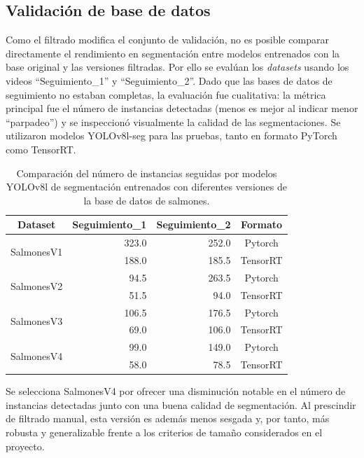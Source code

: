 \subsection{Validación de base de datos}
Como el filtrado modifica el conjunto de validación, no es posible comparar directamente el rendimiento en segmentación entre modelos entrenados con la base original y las versiones filtradas. Por ello se evalúan los \textit{datasets} usando los videos ``Seguimiento_1'' y ``Seguimiento_2''. Dado que las bases de datos de seguimiento no estaban completas, la evaluación fue cualitativa: la métrica principal fue el número de instancias detectadas (menos es mejor al indicar menor ``parpadeo'') y se inspeccionó visualmente la calidad de las segmentaciones. Se utilizaron modelos YOLOv8l-seg para las pruebas, tanto en formato PyTorch como TensorRT.

\begin{table}[htbp]
\centering
\caption[Evaluación entre distintas versiones de la base de datos de salmones]{Comparación del número de instancias seguidas por modelos YOLOv8l de segmentación entrenados con diferentes versiones de la base de datos de salmones.}
\label{tab:seguimientos_versiones_dataset}
\begin{tabular}{|c|r|r|c|}
\hline
\textbf{Dataset} & \multicolumn{1}{c|}{\textbf{Seguimiento\_1}} & \multicolumn{1}{c|}{\textbf{Seguimiento\_2}} & \textbf{Formato} \\ \hline
\multirow{2}{*}{SalmonesV1} & 323.0 & 252.0 & Pytorch \\ \cline{2-4} 
 & 188.0 & 185.5 & TensorRT \\ \hline
\multirow{2}{*}{SalmonesV2} & 94.5 & 263.5 & Pytorch \\ \cline{2-4} 
 & 51.5 & 94.0 & TensorRT \\ \hline
\multirow{2}{*}{SalmonesV3} & 106.5 & 176.5 & Pytorch \\ \cline{2-4} 
 & 69.0 & 106.0 & TensorRT \\ \hline
\multirow{2}{*}{SalmonesV4} & 99.0 & 149.0 & Pytorch \\ \cline{2-4} 
 & 58.0 & 78.5 & TensorRT \\ \hline
\end{tabular}
\end{table}

Se selecciona SalmonesV4 por ofrecer una disminución notable en el número de instancias detectadas junto con una buena calidad de segmentación. Al prescindir de filtrado manual, esta versión es además menos sesgada y, por tanto, más robusta y generalizable frente a los criterios de tamaño considerados en el proyecto.

